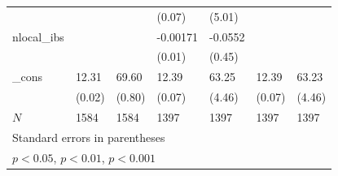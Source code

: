 {\begin{longtable}{|l|ll|ll|ll|}
                        &                     &                     &      (0.07)         &      (5.01)         &                     &                     \\
            [1em]
            nlocal\_ibs  &                     &                     &    -0.00171         &     -0.0552         &                     &                     \\
                        &                     &                     &      (0.01)         &      (0.45)         &                     &                     \\
            [1em]
            \_cons      &       12.31\sym{***}&       69.60\sym{***}&       12.39\sym{***}&       63.25\sym{***}&       12.39\sym{***}&       63.23\sym{***}\\
                        &      (0.02)         &      (0.80)         &      (0.07)         &      (4.46)         &      (0.07)         &      (4.46)         \\
            \hline
            \(N\)       &        1584         &        1584         &        1397         &        1397         &        1397         &        1397         \\
        \hline\hline
        \multicolumn{7}{l}{\footnotesize Standard errors in parentheses}\\
        \multicolumn{7}{l}{\footnotesize \sym{*} \(p<0.05\), \sym{**} \(p<0.01\), \sym{***} \(p<0.001\)}\\
    \end{longtable}
    }
\endgroup
